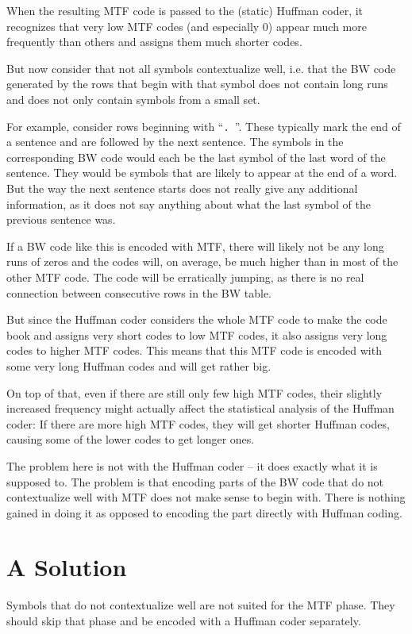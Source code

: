 \documentclass[a4paper]{scrreprt}
\begin{document}
When the resulting MTF code is passed to the (static) Huffman coder, it
recognizes that very low MTF codes (and especially 0) appear much more
frequently than others and assigns them much shorter codes.

But now consider that not all symbols contextualize well, i.e. that the BW code
generated by the rows that begin with that symbol does not contain long runs and
does not only contain symbols from a small set.

For example, consider rows beginning with ``\texttt{. }''. These typically mark
the end of a sentence and are followed by the next sentence. The symbols in the
corresponding BW code would each be the last symbol of the last word of the
sentence. They would be symbols that are likely to appear at the end of a
word. But the way the next sentence starts does not really give any additional
information, as it does not say anything about what the last symbol of the
previous sentence was.

If a BW code like this is encoded with MTF, there will likely not be any long
runs of zeros and the codes will, on average, be much higher than in most of the
other MTF code. The code will be erratically jumping, as there is no real
connection between consecutive rows in the BW table.

But since the Huffman coder considers the whole MTF code to make the code
book and assigns very short codes to low MTF codes, it also assigns very long
codes to higher MTF codes. This means that this MTF code is encoded with some
very long Huffman codes and will get rather big.

On top of that, even if there are still only few high MTF codes, their slightly
increased frequency might actually affect the statistical analysis of the
Huffman coder: If there are more high MTF codes, they will get shorter Huffman
codes, causing some of the lower codes to get longer ones.

The problem here is not with the Huffman coder -- it does exactly what it is
supposed to. The problem is that encoding parts of the BW code that do not
contextualize well with MTF does not make sense to begin with. There is nothing
gained in doing it as opposed to encoding the part directly with Huffman coding.

\section{A Solution}

Symbols that do not contextualize well are not suited for the MTF phase. They
should skip that phase and be encoded with a Huffman coder separately.
\end{document}
